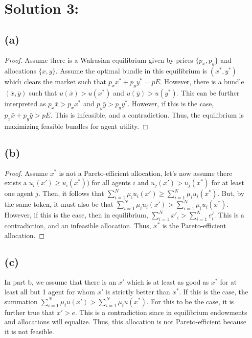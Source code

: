 \documentclass[10pt,a4paper]{article}
\begin{document}
\section*{Solution 3:}
  \subsection*{(a)}
    \begin{proof}
      Assume there is a Walrasian equilibrium given by prices $\{p_x,p_y\}$ and allocations $\{x,y\}$. Assume the optimal bundle in this equilibrium is $(x^*,y^*)$ which clears the market such that $p_xx^* + p_yy^* = pE$. However, there is a bundle $(\bar{x},\bar{y})$ such that $u(\bar{x})>u(x^*)$ and $u(\bar{y}) > u(y^*)$. This can be further interpreted as $p_x\bar{x} > p_xx^*$ and $p_y\bar{y} > p_yy^*$. However, if this is the case, $p_x\bar{x}+p_y\bar{y}>pE$. This is infeasible, and a contradiction. Thus, the equilibrium is maximizing feasible bundles for agent utility. 
    \end{proof}
  \subsection*{(b)}
    \begin{proof}
      Assume $x^*$ is not a Pareto-efficient allocation, let's now assume there exists a $u_i(x')\geq u_i(x^*))$ for all agents $i$ and $u_j(x')>u_j(x^*)$ for at least one agent $j$. Then, it follows that $\sum\limits_{i=1}^N\mu_iu_i(x')\geq\sum\limits_{i=1}^N\mu_iu_i(x^*)$. But, by the same token, it must also be that $\sum\limits_{i=1}^N\mu_iu_i(x')>\sum\limits_{i=1}^N\mu_iu_i(x^*)$. However, if this is the case, then in equilibrium, $\sum\limits_{i=1}^Nx'_i>\sum\limits_{i=1}^Ne_i^j$. This is a contradiction, and an infeasible allocation. Thus, $x^*$ is the Pareto-efficient allocation. 
    \end{proof}
  \subsection*{(c)}
    In part b, we assume that there is an $x'$  which is at least as good as $x^*$ for at least all but 1 agent for whom $x'$ is strictly better than $x^*$. If this is the case, the summation $\sum\limits_{i=1}^N\mu_iu(x')>\sum\limits_{i=1}^N\mu_iu(x^*)$. For this to be the case, it is further true that $x'>e$. This is a contradiction since in equilibrium endowments and allocations will equalize. Thus, this allocation is not Pareto-efficient because it is not feasible.
\end{document}
